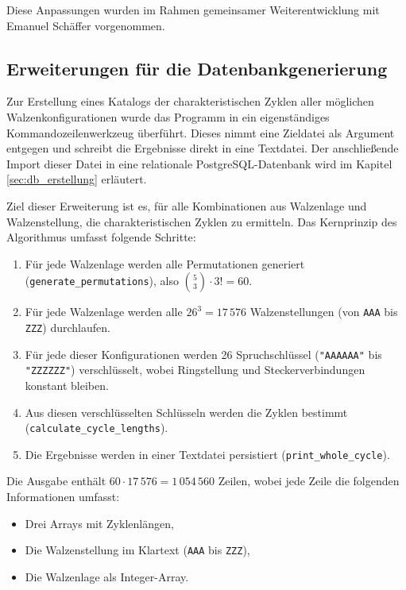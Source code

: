 \documentclass[12pt, ngerman, a4paper, numbers=noenddot]{article}
\begin{document}
Diese Anpassungen wurden im Rahmen gemeinsamer Weiterentwicklung mit Emanuel Schäffer vorgenommen. 


\newpage
\subsection{Erweiterungen für die Datenbankgenerierung}
\label{subsec:c_db_export}

Zur Erstellung eines Katalogs der charakteristischen Zyklen aller möglichen Walzenkonfigurationen wurde das Programm in ein eigenständiges Kommandozeilenwerkzeug überführt. Dieses nimmt eine Zieldatei als Argument entgegen und schreibt die Ergebnisse direkt in eine Textdatei. Der anschließende Import dieser Datei in eine relationale PostgreSQL-Datenbank wird im Kapitel \ref{sec:db_erstellung} erläutert.


Ziel dieser Erweiterung ist es, für alle Kombinationen aus Walzenlage und Walzenstellung, die charakteristischen Zyklen zu ermitteln. Das Kernprinzip des Algorithmus umfasst folgende Schritte:

\begin{enumerate}
	\item Für jede Walzenlage werden alle Permutationen generiert \newline(\lstinline|generate_permutations|), also \(\binom{5}{3} \cdot 3! = 60\).
	\item Für jede Walzenlage werden alle $26^3 = 17\,576$ Walzenstellungen (von \lstinline|AAA| bis \lstinline|ZZZ|) durchlaufen.
	\item Für jede dieser Konfigurationen werden 26 Spruchschlüssel (\lstinline|"AAAAAA"| bis \lstinline|"ZZZZZZ"|) verschlüsselt, wobei Ringstellung und Steckerverbindungen konstant bleiben.
	\item Aus diesen verschlüsselten Schlüsseln werden die Zyklen bestimmt \newline(\lstinline|calculate_cycle_lengths|).
	\item Die Ergebnisse werden in einer Textdatei persistiert (\lstinline|print_whole_cycle|).
\end{enumerate}

Die Ausgabe enthält $60 \cdot 17\,576 = 1\,054\,560$ Zeilen, wobei jede Zeile die folgenden Informationen umfasst:

\begin{itemize}
	\item Drei Arrays mit Zyklenlängen,
	\item Die Walzenstellung im Klartext (\lstinline|AAA| bis \lstinline|ZZZ|),
	\item Die Walzenlage als Integer-Array.
\end{itemize}
\end{document}
